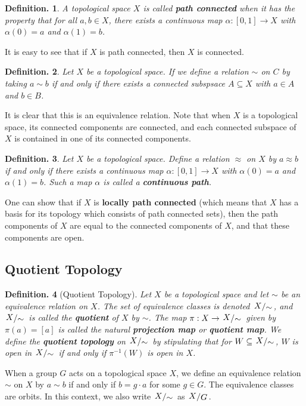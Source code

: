 \documentclass[11pt, a4paper]{memoir}
\theoremstyle{change}
\theoremstyle{plain}
\theoremstyle{nonumberplain}
\newtheorem{definition}{Definition.}
\newcommand{\quot}[2]{\mathchoice{\left.\raisebox{0.14em}{$#1$}\middle/\raisebox{-0.14em}{$#2$}\right.}
                                 {\left.\raisebox{0.08em}{$#1$}\middle/\raisebox{-0.08em}{$#2$}\right.}
                                 {\left.\raisebox{0.03em}{$#1$}\middle/\raisebox{-0.03em}{$#2$}\right.}
                                 {\left.\raisebox{0em}{$#1$}\middle/\raisebox{0em}{$#2$}\right.}}
\numberwithin{equation}{section}
\begin{document}
\begin{definition}
    A topological space $X$ is called \textbf{path connected} when it has the property that for all $a,b\in X$, there exists a continuous map $\alpha:[0,1]\to X$ with $\alpha(0)=a$ and $\alpha(1)=b$.
\end{definition}
It is easy to see that if $X$ is path connected, then $X$ is connected.
\begin{definition}
    Let $X$ be a topological space.
    If we define a relation $\sim$ on $C$ by taking $a\sim b$ if and only if there exists a connected subspsace $A\subseteq X$ with $a\in A$ and $b\in B$.
\end{definition}
It is clear that this is an equivalence relation.
Note that when $X$ is a topological space, its connected components are connected, and each connected subspace of $X$ is contained in one of its connected components.
\begin{definition}
    Let $X$ be a topological space.
    Define a relation $\approx$ on $X$ by $a\approx b$ if and only if there exists a continuous map $\alpha:[0,1]\to X$ with $\alpha(0)=a$ and $\alpha(1)=b$.
    Such a map $\alpha$ is called a \textbf{continuous path}.
\end{definition}
One can show that if $X$ is \textbf{locally path connected} (which means that $X$ has a basis for its topology which consists of path connected sets), then the path components of $X$ are equal to the connected components of $X$, and that these components are open.
\subsection{Quotient Topology}
\begin{definition}[Quotient Topology]
    Let $X$ be a topological space and let $\sim$ be an equivalence relation on $X$.
    The set of equivalence classes is denoted $\quot{X}{\sim}$, and $\quot{X}{\sim}$ is called the \textbf{quotient} of $X$ by $\sim$.
    The map $\pi:X\to\quot{X}{\sim}$ given by $\pi(a)=[a]$ is called the natural \textbf{projection map} or \textbf{quotient map}.
    We define the \textbf{quotient topology} on $\quot{X}{\sim}$ by stipulating that for $W\subseteq \quot{X}{\sim}$, $W$ is open in $\quot{X}{\sim}$ if and only if $\pi^{-1}(W)$ is open in $X$.
\end{definition}
When a group $G$ acts on a topological space $X$, we define an equivalence relation $\sim$ on $X$ by $a\sim b$ if and only if $b=g\cdot a$ for some $g\in G$.
The equivalence classes are orbits.
In this context, we also write $\quot{X}{\sim}$ as $\quot{X}{G}$.
\end{document}

